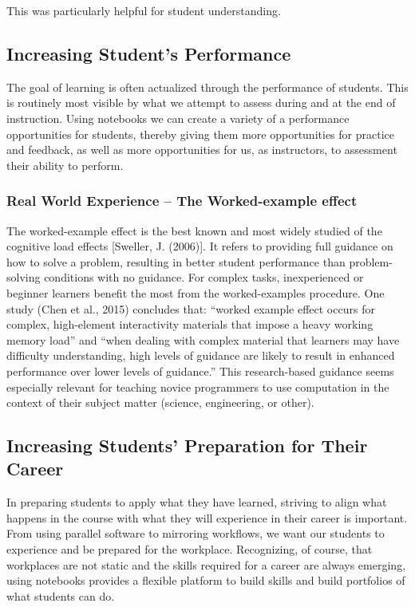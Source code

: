 \documentclass[]{book}
\begin{document}
This was particularly helpful for student understanding.

\subsection{Increasing Student's
Performance}\label{increasing-students-performance}

The goal of learning is often actualized through the performance of
students. This is routinely most visible by what we attempt to assess
during and at the end of instruction. Using notebooks we can create a
variety of a performance opportunities for students, thereby giving them
more opportunities for practice and feedback, as well as more
opportunities for us, as instructors, to assessment their ability to
perform.

\subsubsection{Real World Experience -- The Worked-example
effect}\label{real-world-experience-the-worked-example-effect}

The worked-example effect is the best known and most widely studied of
the cognitive load effects {[}Sweller, J. (2006){]}. It refers to
providing full guidance on how to solve a problem, resulting in better
student performance than problem-solving conditions with no guidance.
For complex tasks, inexperienced or beginner learners benefit the most
from the worked-examples procedure. One study (Chen et al., 2015)
concludes that: ``worked example effect occurs for complex, high-element
interactivity materials that impose a heavy working memory load'' and
``when dealing with complex material that learners may have difficulty
understanding, high levels of guidance are likely to result in enhanced
performance over lower levels of guidance.'' This research-based
guidance seems especially relevant for teaching novice programmers to
use computation in the context of their subject matter (science,
engineering, or other).

\subsection{Increasing Students' Preparation for Their
Career}\label{increasing-students-preparation-for-their-career}

In preparing students to apply what they have learned, striving to align
what happens in the course with what they will experience in their
career is important. From using parallel software to mirroring
workflows, we want our students to experience and be prepared for the
workplace. Recognizing, of course, that workplaces are not static and
the skills required for a career are always emerging, using notebooks
provides a flexible platform to build skills and build portfolios of
what students can do.
\end{document}
